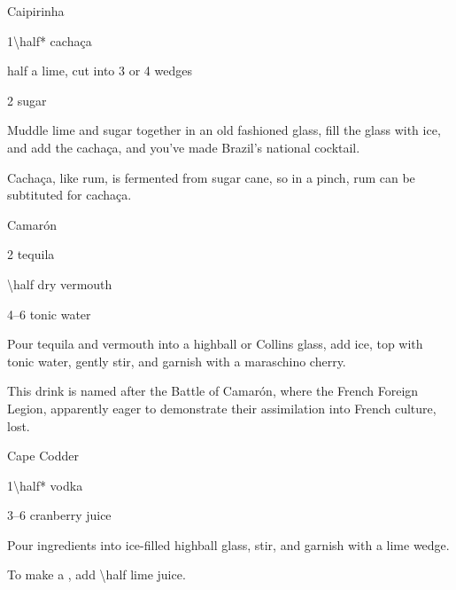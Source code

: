 \begin{Cocktail}{Caipirinha}
  \begin{Ingredients}
  \item \SI{1\half*}{\oz} cacha\c{c}a
  \item half a lime, cut into 3 or 4 wedges
  \item \SI{2}{\tsp} sugar
  \end{Ingredients}
  
  \begin{Instructions}
	Muddle lime and sugar together in an old fashioned glass, fill the glass with ice, and add the cacha\c{c}a, and you've made Brazil's national cocktail.
	
	Cacha\c{c}a, like rum, is fermented from sugar cane, so in a pinch, rum can be subtituted for cacha\c{c}a.
  \end{Instructions}
\end{Cocktail}

\begin{Cocktail*}{Camar\'{o}n}
  \begin{Ingredients}
  \item \SI{2}{\oz} tequila
  \item \SI{\half}{\oz} dry vermouth
  \item \SIrange{4}{6}{\oz} tonic water
  \end{Ingredients}
  
  \begin{Instructions}
	Pour tequila and vermouth into a highball or Collins glass, add ice, top with tonic water, gently stir, and garnish with a maraschino cherry.
	
	This drink is named after the Battle of Camar\'on, where the French Foreign Legion, apparently eager to demonstrate their assimilation into French culture, lost.
  \end{Instructions}
\end{Cocktail*}

\begin{Cocktail}{Cape Codder}
  \begin{Ingredients}
  \item \SI{1\half*}{\oz} vodka
  \item \SIrange{3}{6}{\oz} cranberry juice
  \end{Ingredients}
  
  \begin{Instructions}
	Pour ingredients into ice-filled highball glass, stir, and garnish with a lime wedge.
	
	To make a , add \SI{\half}{\oz} lime juice.
  \end{Instructions}
\end{Cocktail}

